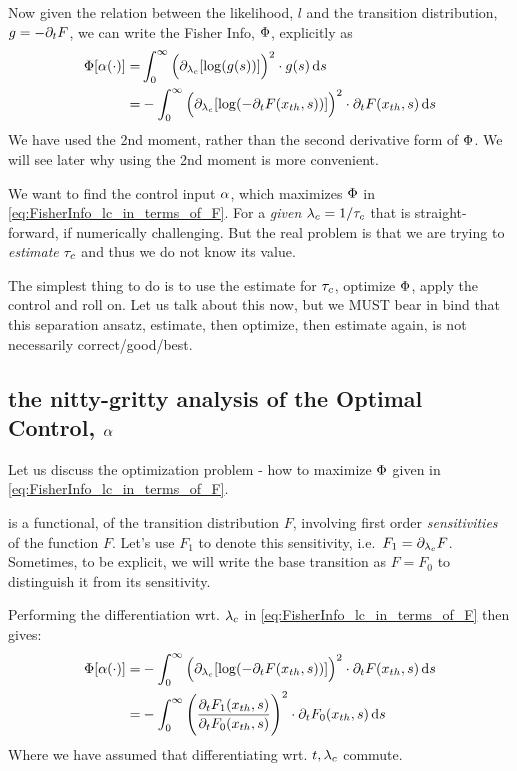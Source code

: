 \documentclass{article}
\begin{document}
Now given the relation between the likelihood, $l$ and the transition
distribution, $g = -{\partial}_t F$, we can write the Fisher Info, ${\Phi}$, explicitly
as
\begin{subequations}

\begin{align}
 {\Phi}[{\alpha}(\cdot)] =& 
\int_0^{\infty}  \Big( {\partial}_{{ \lambda_{c} }} [ \log(
g(s) )] \Big)^2  \cdot g(s) \, \mathrm{d} s
\label{eq:FisherInfo_lc_in_terms_of_g}
\\
=&- \int_0^{\infty}  \Big( {\partial}_{{ \lambda_{c} }} [ \log(
-{\partial}_t F({ x_{th} }, s) )] \Big)^2  \cdot {\partial}_t F({ x_{th} }, s)  \, \mathrm{d} s
\label{eq:FisherInfo_lc_in_terms_of_F}
\end{align}
\end{subequations}
We have used the 2nd moment, rather than the second derivative form of ${\Phi}$. We
will see later why using the 2nd moment is more convenient.

We want to find the control input ${\alpha}$, which maximizes ${\Phi}$ in
\cref{eq:FisherInfo_lc_in_terms_of_F}. For a {\sl given} ${ \lambda_{c} } = 1/{ \tau_{c} }$ that is
straight-forward, if numerically challenging. But the real problem is that we
are trying to {\sl estimate} ${ \tau_{c} }$ and thus we do not know its value.

The simplest thing to do is to use the estimate for ${ \tau_{c} }$, optimize ${\Phi}$, apply
the control and roll on. Let us talk about this now, but we MUST bear in bind
that this separation ansatz, estimate, then optimize, then estimate again, is
not necessarily correct/good/best.

\subsection{the nitty-gritty analysis of the Optimal Control, ${\alpha}$}

Let us discuss the optimization problem - how to maximize ${\Phi}$ given in
\cref{eq:FisherInfo_lc_in_terms_of_F}.

 is a functional, of the transition
distribution $F$, involving first order {\sl sensitivities} of the function
$F$. Let's use $F_1$ to denote this sensitivity, i.e.\ $F_1 = {\partial}_{ \lambda_{c} } F$.
Sometimes, to be explicit, we will write the base transition as $F = F_0$ to
distinguish it from its sensitivity.
 
Performing the differentiation wrt. ${ \lambda_{c} }$ in
\cref{eq:FisherInfo_lc_in_terms_of_F} then gives:
 \begin{align}
 {\Phi}[{\alpha}(\cdot)] =& 
 -\int_0^{\infty}  \Big( {\partial}_{{ \lambda_{c} }} [ \log(
-{\partial}_t F({ x_{th} }, s) )] \Big)^2  \cdot {\partial}_t F({ x_{th} }, s)  \, \mathrm{d} s
\nonumber
\\
=& 
 -\int_0^{\infty}  \Bigg( \frac{{\partial}_t F_1({ x_{th} },s)}
							  {{\partial}_t F_0({ x_{th} },s)} \Bigg)^2  
\cdot {\partial}_t F_0({ x_{th} }, s)  \, \mathrm{d} s
\label{eq:FisherInfo_lc_in_terms_of_F0_F1} 
\end{align}
Where we have assumed that differentiating wrt. $t, { \lambda_{c} }$ commute.
\end{document}
